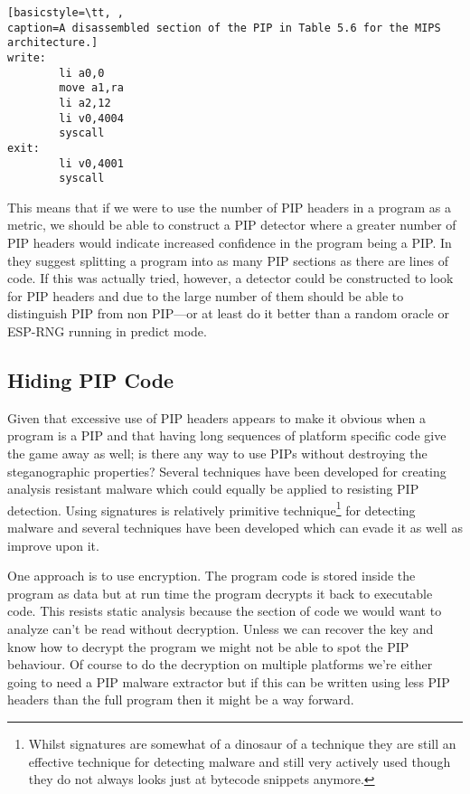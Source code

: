 \documentclass[10pt,]{book}
\begin{document}
\begin{lstlisting}[basicstyle=\tt, ,
caption=A disassembled section of the PIP in Table 5.6 for the MIPS architecture.]
write:
        li a0,0
        move a1,ra
        li a2,12
        li v0,4004
        syscall
exit:
        li v0,4001
        syscall
\end{lstlisting}
This means that if we were to use the number of PIP headers in a program
as a metric, we should be able to construct a PIP detector where a
greater number of PIP headers would indicate increased confidence in the
program being a PIP. In \autocite{Cha:2010uh} they suggest splitting a
program into as many PIP sections as there are lines of code. If this
was actually tried, however, a detector could be constructed to look for
PIP headers and due to the large number of them should be able to
distinguish PIP from non PIP---or at least do it better than a random
oracle or ESP-RNG running in predict mode\autocite{Birkett:vw}.

\subsection{Hiding PIP Code}

Given that excessive use of PIP headers appears to make it obvious when
a program is a PIP and that having long sequences of platform specific
code give the game away as well; is there any way to use PIPs without
destroying the steganographic properties? Several techniques have been
developed for creating analysis resistant
malware\autocite{Bethencourt:2008ug} which could equally be applied to
resisting PIP detection. Using signatures is relatively primitive
technique\footnote{Whilst signatures are somewhat of a
  dinosaur\autocite{Lull:1910tz} of a technique they are still an
  effective technique for detecting malware and still very actively used
  though they do not always looks just at bytecode snippets
  anymore.\autocite{Acosta:wz}\autocite{Liang:2011va}} for detecting
malware\autocite{Zhang:2007jy} and several techniques have been
developed which can evade it as well as improve upon it.

One approach is to use encryption. The program code is stored inside the
program as data but at run time the program decrypts it back to
executable code\autocite{Royal:2006ug}. This resists static analysis
because the section of code we would want to analyze can't be read
without decryption. Unless we can recover the key and know how to
decrypt the program we might not be able to spot the PIP behaviour. Of
course to do the decryption on multiple platforms we're either going to
need a PIP malware extractor but if this can be written using less PIP
headers than the full program then it might be a way forward.
\end{document}
